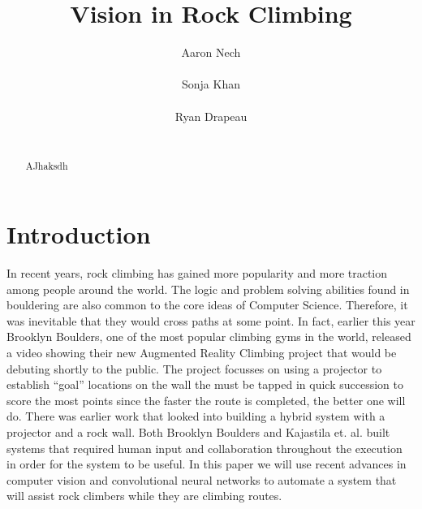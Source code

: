 \documentclass{chi2009}
\begin{document}
\setlength{\paperheight}{11in}
\setlength{\paperwidth}{8.5in}
\setlength{\pdfpageheight}{\paperheight}
\setlength{\pdfpagewidth}{\paperwidth}


\title{Vision in Rock Climbing}
\author{
  \alignauthor Aaron Nech\\
    \\
  \alignauthor Sonja Khan\\
    \\
  \alignauthor Ryan Drapeau\\
    \\
}

\maketitle

\begin{abstract}
AJhaksdh
\end{abstract}


\section{Introduction}
In recent years, rock climbing has gained more popularity and more traction among people around the world. The logic and problem solving abilities found in bouldering are also common to the core ideas of Computer Science. Therefore, it was inevitable that they would cross paths at some point. In fact, earlier this year Brooklyn Boulders, one of the most popular climbing gyms in the world, released a video showing their new Augmented Reality Climbing project that would be debuting shortly to the public. The project focusses on using a projector to establish ``goal'' locations on the wall the must be tapped in quick succession to score the most points since the faster the route is completed, the better one will do. There was earlier work that looked into building a hybrid system with a projector and a rock wall. Both Brooklyn Boulders and Kajastila et. al. built systems that required human input and collaboration throughout the execution in order for the system to be useful. In this paper we will use recent advances in computer vision and convolutional neural networks to automate a system that will assist rock climbers while they are climbing routes.
\end{document}
